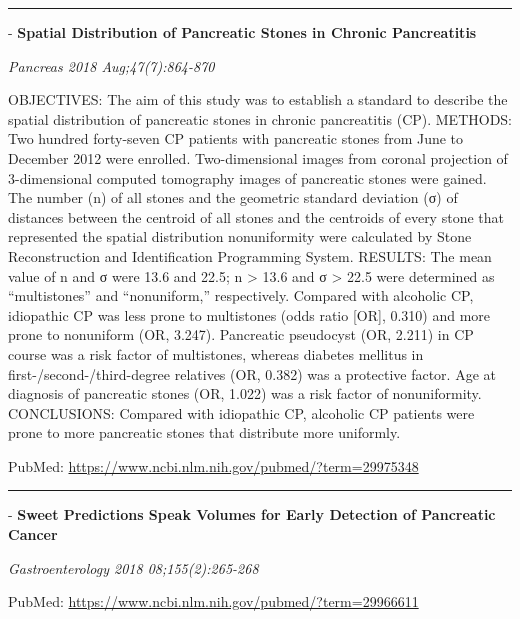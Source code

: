 \documentclass[]{article}
\begin{document}
{}

\begin{center}\rule{0.5\linewidth}{\linethickness}\end{center}

 - \textbf{Spatial Distribution of Pancreatic Stones in Chronic
Pancreatitis}

\emph{Pancreas 2018 Aug;47(7):864-870}

OBJECTIVES: The aim of this study was to establish a standard to
describe the spatial distribution of pancreatic stones in chronic
pancreatitis (CP). METHODS: Two hundred forty-seven CP patients with
pancreatic stones from June to December 2012 were enrolled.
Two-dimensional images from coronal projection of 3-dimensional computed
tomography images of pancreatic stones were gained. The number (n) of
all stones and the geometric standard deviation (σ) of distances between
the centroid of all stones and the centroids of every stone that
represented the spatial distribution nonuniformity were calculated by
Stone Reconstruction and Identification Programming System. RESULTS: The
mean value of n and σ were 13.6 and 22.5; n \textgreater{} 13.6 and σ
\textgreater{} 22.5 were determined as ``multistones'' and
``nonuniform,'' respectively. Compared with alcoholic CP, idiopathic CP
was less prone to multistones (odds ratio {[}OR{]}, 0.310) and more
prone to nonuniform (OR, 3.247). Pancreatic pseudocyst (OR, 2.211) in CP
course was a risk factor of multistones, whereas diabetes mellitus in
first-/second-/third-degree relatives (OR, 0.382) was a protective
factor. Age at diagnosis of pancreatic stones (OR, 1.022) was a risk
factor of nonuniformity. CONCLUSIONS: Compared with idiopathic CP,
alcoholic CP patients were prone to more pancreatic stones that
distribute more uniformly.

PubMed: \url{https://www.ncbi.nlm.nih.gov/pubmed/?term=29975348}

{}

{}

\begin{center}\rule{0.5\linewidth}{\linethickness}\end{center}

 - \textbf{Sweet Predictions Speak Volumes for Early Detection of
Pancreatic Cancer}

\emph{Gastroenterology 2018 08;155(2):265-268}

PubMed: \url{https://www.ncbi.nlm.nih.gov/pubmed/?term=29966611}

{}
\end{document}
